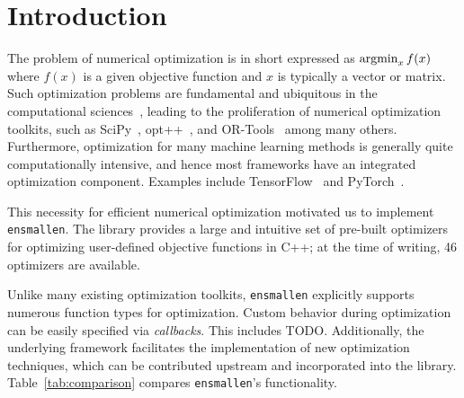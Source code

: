 \documentclass[twoside,11pt]{article}
\begin{document}
\section{Introduction}
\label{sec:introduction}

The problem of numerical optimization is in short expressed as
$\operatornamewithlimits{argmin}_x f(x)$
where $f(x)$ is a given objective function and $x$ is typically a vector or matrix.
Such optimization problems are fundamental and ubiquitous in the computational sciences~\citep{Nocedal_2006},
leading to the proliferation of numerical optimization toolkits,
such as SciPy~\citep{2019arXiv190710121V},
opt++~\citep{meza1994opt++},
and 
OR-Tools~\citep{ortools} among many others.
Furthermore, optimization for many machine learning methods is generally quite computationally
intensive, and hence most frameworks have an integrated optimization component.
Examples include TensorFlow~\citep{tensorflow2015-whitepaper} 
and PyTorch~\citep{NEURIPS2019_9015}.


This necessity for efficient numerical optimization
motivated us to implement {\tt ensmallen}.
The library provides a large and intuitive {set of pre-built optimizers}
for optimizing {user-defined objective functions} in C++;
at the time of writing, 46 optimizers are available.

Unlike many existing optimization toolkits,
{\tt ensmallen} explicitly supports numerous function types for
optimization.
Custom behavior during optimization can be easily specified via {\it callbacks}.
This includes TODO.
Additionally, the underlying framework facilitates the implementation of new optimization techniques,
which can be contributed upstream and incorporated into the library.
Table~\ref{tab:comparison} compares {\tt ensmallen}'s functionality.
\end{document}
